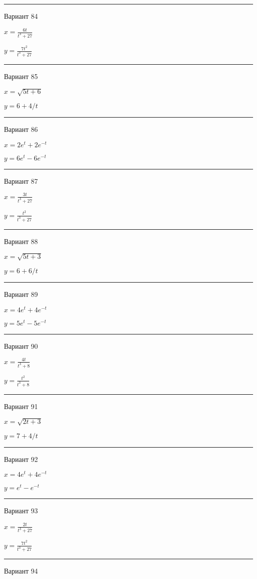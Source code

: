 \documentclass[11pt]{report}
\begin{document}
\rule{\textwidth}{.2mm}

 Вариант 84

$x = \frac{6 t}{t^{3} + 27}$

$y = \frac{7 t^{2}}{t^{3} + 27}$

\rule{\textwidth}{.2mm}

 Вариант 85

$x = \sqrt{5 t + 6}$

$y = 6 + 4 / t$

\rule{\textwidth}{.2mm}

 Вариант 86

$x = 2 e^{t} + 2 e^{- t}$

$y = 6 e^{t} - 6 e^{- t}$

\rule{\textwidth}{.2mm}

 Вариант 87

$x = \frac{3 t}{t^{3} + 27}$

$y = \frac{t^{2}}{t^{3} + 27}$

\rule{\textwidth}{.2mm}

 Вариант 88

$x = \sqrt{5 t + 3}$

$y = 6 + 6 / t$

\rule{\textwidth}{.2mm}

 Вариант 89

$x = 4 e^{t} + 4 e^{- t}$

$y = 5 e^{t} - 5 e^{- t}$

\rule{\textwidth}{.2mm}

 Вариант 90

$x = \frac{4 t}{t^{3} + 8}$

$y = \frac{t^{2}}{t^{3} + 8}$

\rule{\textwidth}{.2mm}

 Вариант 91

$x = \sqrt{2 t + 3}$

$y = 7 + 4 / t$

\rule{\textwidth}{.2mm}

 Вариант 92

$x = 4 e^{t} + 4 e^{- t}$

$y = e^{t} - e^{- t}$

\rule{\textwidth}{.2mm}

 Вариант 93

$x = \frac{2 t}{t^{3} + 27}$

$y = \frac{7 t^{2}}{t^{3} + 27}$

\rule{\textwidth}{.2mm}

 Вариант 94
\end{document}

